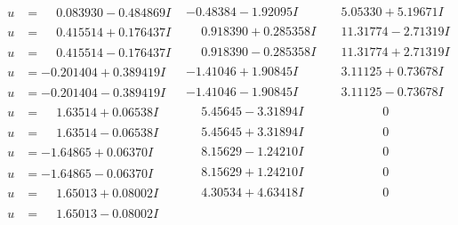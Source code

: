 \documentclass[1p]{elsarticle_modified}
\theoremstyle{definition}
\begin{document}
$$\begin{array}{c|c|c}
 \hline 
\begin{aligned}
u &= \phantom{-}0.083930 - 0.484869 I\end{aligned}
 & -0.48384 - 1.92095 I & \phantom{-}5.05330 + 5.19671 I \\ \hline\begin{aligned}
u &= \phantom{-}0.415514 + 0.176437 I\end{aligned}
 & \phantom{-}0.918390 + 0.285358 I & \phantom{-}11.31774 - 2.71319 I \\ \hline\begin{aligned}
u &= \phantom{-}0.415514 - 0.176437 I\end{aligned}
 & \phantom{-}0.918390 - 0.285358 I & \phantom{-}11.31774 + 2.71319 I \\ \hline\begin{aligned}
u &= -0.201404 + 0.389419 I\end{aligned}
 & -1.41046 + 1.90845 I & \phantom{-}3.11125 + 0.73678 I \\ \hline\begin{aligned}
u &= -0.201404 - 0.389419 I\end{aligned}
 & -1.41046 - 1.90845 I & \phantom{-}3.11125 - 0.73678 I \\ \hline\begin{aligned}
u &= \phantom{-}1.63514 + 0.06538 I\end{aligned}
 & \phantom{-}5.45645 - 3.31894 I & \phantom{-0.000000 } 0 \\ \hline\begin{aligned}
u &= \phantom{-}1.63514 - 0.06538 I\end{aligned}
 & \phantom{-}5.45645 + 3.31894 I & \phantom{-0.000000 } 0 \\ \hline\begin{aligned}
u &= -1.64865 + 0.06370 I\end{aligned}
 & \phantom{-}8.15629 - 1.24210 I & \phantom{-0.000000 } 0 \\ \hline\begin{aligned}
u &= -1.64865 - 0.06370 I\end{aligned}
 & \phantom{-}8.15629 + 1.24210 I & \phantom{-0.000000 } 0 \\ \hline\begin{aligned}
u &= \phantom{-}1.65013 + 0.08002 I\end{aligned}
 & \phantom{-}4.30534 + 4.63418 I & \phantom{-0.000000 } 0 \\ \hline\begin{aligned}
u &= \phantom{-}1.65013 - 0.08002 I\end{aligned}

\end{array}$$
\end{document}
